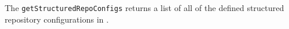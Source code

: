 The \verb+getStructuredRepoConfigs+ returns a list of all of the defined structured repository configurations in \Rapture.
